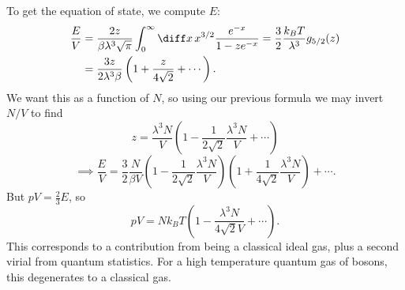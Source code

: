 \documentclass[12pt]{article}
\begin{document}
To get the equation of state, we compute $E$:
\begin{align*}
	\frac{E}{V} &= \frac{2z}{\beta \lambda^3 \sqrt \pi} \int_0^\infty \diff x \, x^{3/2} \frac{e^{-x}}{1 - z e^{-x}} = \frac{3}{2} \frac{k_B T}{\lambda^3} g_{5/2}(z) \\
		    &= \frac{3z}{2 \lambda^3 \beta} \left(1 + \frac{z}{4 \sqrt 2} + \cdots \right).
\end{align*}
We want this as a function of $N$, so using our previous formula we may invert $N/V$ to find
\[
z = \frac{\lambda^3 N}{V} \left(1 - \frac{1}{2 \sqrt 2} \frac{\lambda^3 N}{V} + \cdots \right)
\]
\[
\implies \frac{E}{V} = \frac{3}{2} \frac{N}{\beta V} \left(1 - \frac{1}{2 \sqrt 2} \frac{\lambda^3N}{V} \right)\left(1 + \frac{1}{4 \sqrt 2} \frac{\lambda^3 N}{V} \right) + \cdots.
\]
But $pV = \frac{2}{3}E$, so
\[
pV = N k_B T \left(1 - \frac{\lambda^3 N}{4 \sqrt 2 V} + \cdots \right).
\]
This corresponds to a contribution from being a classical ideal gas, plus a second virial from quantum statistics. For a high temperature quantum gas of bosons, this degenerates to a classical gas.
\end{document}
